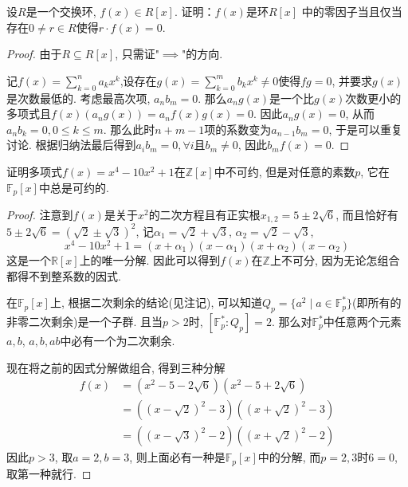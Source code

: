 \begin{problem}
    设$R$是一个交换环, $f(x) \in R[x]$. 证明：$f(x)$是环$R[x]$
中的零因子当且仅当存在$0 \neq r \in R$使得$r \cdot f(x) = 0$.
\end{problem}

\begin{proof}
    由于$R \subseteq R[x]$, 只需证"$\implies$"的方向.

    记$f(x) = \sum_{k = 0}^{n} a_kx^k$,设存在$g(x) = \sum_{k = 0}^{m} b_kx^k \neq 0$使得$fg = 0$, 并要求$g(x)$是次数最低的. 考虑最高次项, $a_nb_m = 0$. 那么$a_ng(x)$是一个比$g(x)$次数更小的多项式且$f(x)(a_ng(x)) = a_nf(x)g(x) = 0$. 因此$a_ng(x) = 0$, 从而$a_nb_k = 0, 0 \leqslant k \leqslant m$. 那么此时$n + m - 1$项的系数变为$a_{n - 1}b_m = 0$, 于是可以重复讨论. 根据归纳法最后得到$a_ib_m = 0, \forall i$且$b_m \neq 0$, 因此$b_mf(x) = 0$.
\end{proof}

\begin{problem}
    证明多项式$f(x) = x^4 - 10x^2 + 1$在$\mathbb{Z}[x]$中不可约, 
但是对任意的素数$p$, 它在$\mathbb{F}_p[x]$中总是可约的.
\end{problem}

\begin{proof}
    注意到$f(x)$是关于$x^2$的二次方程且有正实根$x_{1,2} =  5 \pm 2\sqrt{6}$, 而且恰好有$5 \pm 2\sqrt{6} = (\sqrt{2} \pm \sqrt{3})^2$, 记$\alpha_1 = \sqrt{2} + \sqrt{3}$, $\alpha_2 = \sqrt{2} - \sqrt{3}$,
    \[
        x^4 - 10x^2 + 1 = (x + \alpha_1)(x - \alpha_1)(x + \alpha_2)(x - \alpha_2)
    \]
    这是一个$\mathbb{R}[x]$上的唯一分解. 因此可以得到$f(x)$在$\mathbb{Z}$上不可分, 因为无论怎组合都得不到整系数的因式.

    在$\mathbb{F}_p[x]$上, 根据二次剩余的结论(见注记), 可以知道$Q_p = \{a^2 \mid a \in \mathbb{F}_p^*\}$(即所有的非零二次剩余)是一个子群. 且当$p > 2$时, $[\mathbb{F}_p^*:Q_p] = 2$. 那么对$\mathbb{F}_p^*$中任意两个元素$a, b$, $a, b, ab$中必有一个为二次剩余.

    现在将之前的因式分解做组合, 得到三种分解
    \[
    \begin{aligned}
        f(x) &= (x^2 - 5 - 2\sqrt{6})(x^2 - 5 + 2\sqrt{6})\\
        &= ((x - \sqrt{2})^2 - 3)((x + \sqrt{2})^2 - 3)\\
        &= ((x - \sqrt{3})^2 - 2)((x + \sqrt{2})^2 - 2)
    \end{aligned}
    \]
    因此$p > 3$, 取$a = 2, b = 3$, 则上面必有一种是$\mathbb{F}_p[x]$中的分解, 而$p = 2, 3$时$6 = 0$, 取第一种就行.
\end{proof}

